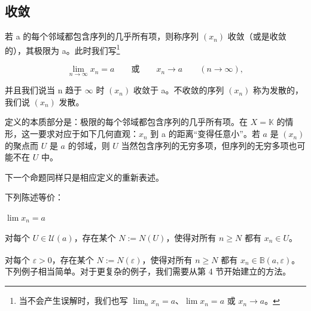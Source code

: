 \subsection*{收敛}

若 a 的每个邻域都包含序列的几乎所有项，则称序列  $ (x_n) $ 收敛（或是收敛的），其极限为 a。此时我们写\footnote{当不会产生误解时，我们也写 $\lim_{n}x_{n}=a$、$\lim x_{n}=a$ 或 $x_{n}\to a$。}

\[
\lim_{n\to\infty}x_{n}=a\qquad\text{或}\qquad x_{n}\to a\qquad(n\to\infty),
\]

并且我们说当 n 趋于  $ \infty $ 时  $ (x_n) $ 收敛于 a。不收敛的序列  $ (x_n) $ 称为发散的，我们说  $ (x_n) $ 发散。

定义的本质部分是：极限的每个邻域都包含序列的几乎所有项。在  $ X = \mathbb{K} $ 的情形，这一要求对应于如下几何直观：$ x_n $ 到 a 的距离“变得任意小”。若  $ a $ 是  $ (x_n) $ 的聚点而  $ U $ 是  $ a $ 的邻域，则  $ U $ 当然包含序列的无穷多项，但序列的无穷多项也可能不在  $ U $ 中。

下一个命题同样只是相应定义的重新表述。

\begin{proposition}

下列陈述等价：

\begin{subitems}
\item

$ \lim x_{n}=a $

\item

对每个  $ U \in \mathcal{U}(a) $，存在某个 $ N := N(U) $，使得对所有  $ n \geq N $ 都有  $ x_n \in U $。

\item

对每个  $ \varepsilon > 0 $，存在某个\textsuperscript{\thefootnote} $ N := N(\varepsilon) $，使得对所有  $ n \geq N $ 都有  $ x_n \in \mathbb{B}(a, \varepsilon) $。
下列例子相当简单。对于更复杂的例子，我们需要从第 4 节开始建立的方法。

\end{subitems}

\end{proposition}

